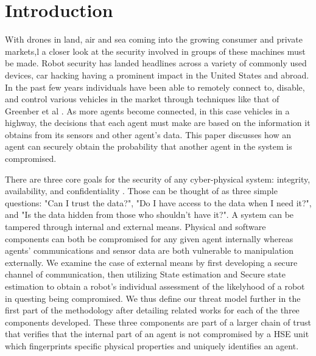 \documentclass[conference]{IEEEtran}
\begin{document}




%
\IEEEpeerreviewmaketitle

\section{Introduction}
With drones in land, air and sea coming into the growing consumer and private markets,l a closer look at the security involved in groups of these machines must be made. Robot security has landed headlines across a variety of commonly used devices, car hacking having a prominent impact in the United States and abroad. In the past few years individuals have been able to remotely connect to, disable, and control various vehicles in the market through techniques like that of Greenber et al \cite{greenberg2015hackers}. As more agents become connected, in this case vehicles in a highway, the decisions that each agent must make are based on the information it obtains from its sensors and other agent's data. This paper discusses how an agent can securely obtain the probability that another agent in the system is compromised.

There are three core goals for the security of any cyber-physical system: integrity, availability, and confidentiality \cite{Cardenas2008}. Those can be thought of as three simple questions: "Can I trust the data?", "Do I have access to the data when I need it?", and "Is the data hidden from those who shouldn't have it?". A system can be tampered through internal and external means. Physical and software components can both be compromised for any given agent internally whereas agents' communications and sensor data are both vulnerable to manipulation externally. We examine the case of external means by first developing a secure channel of communication, then utilizing State estimation and Secure state estimation to obtain a robot's individual assessment of the likelyhood of a robot in questing being compromised. We thus define our threat model further in the first part of the methodology after detailing related works for each of the three components developed. These three components are part of a larger chain of trust that verifies that the internal part of an agent is not compromised by a HSE unit which fingerprints specific physical properties and uniquely identifies an agent.
\end{document}
